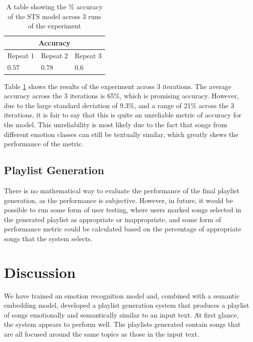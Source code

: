 \documentclass[11pt]{article}
\begin{document}
\begin{table}[H]
    \centering
    \caption{A table showing the \% accuracy of the STS model across 3 runs of the experiment}
    \begin{tabularx}{0.48\textwidth}{|X X X|} 
      \hline
      \multicolumn{3}{|c|}{Accuracy} \\ \hline 
      Repeat 1 & Repeat 2 & Repeat 3 \\ \hline
      $0.57$&$0.78$ &$0.6$ \\ \hline
    \end{tabularx}
    \label{tbl:stsAcc}
\end{table}

Table \ref{tbl:stsAcc} shows the results of the experiment across 3 iterations. The average accuracy across the 3 iterations is 65\%, which is promising accuracy. However, due to the large standard deviation of 9.3\%, and a range of 21\% across the 3 iterations, it is fair to say that this is quite an unreliable metric of accuracy for the model. This unreliability is most likely due to the fact that songs from different emotion classes can still be textually similar, which greatly skews the performance of the metric.

\subsection{Playlist Generation}

There is no mathematical way to evaluate the performance of the final playlist generation, as the performance is subjective. However, in future, it would be possible to run some form of user testing, where users marked songs selected in the generated playlist as appropriate or inappropriate, and some form of performance metric could be calculated based on the percentage of appropriate songs that the system selects.

\section{Discussion}

We have trained an emotion recognition model and, combined with a semantic embedding model, developed a playlist generation system that produces a playlist of songs emotionally and semantically similar to an input text. At first glance, the system appears to perform well. The playlists generated contain songs that are all focused around the same topics as those in the input text.
\end{document}
